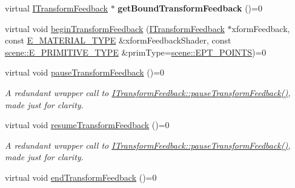 \begin{DoxyCompactItemize}
\item 
virtual \hyperlink{classirr_1_1video_1_1ITransformFeedback}{I\+Transform\+Feedback} $\ast$ {\bfseries get\+Bound\+Transform\+Feedback} ()=0\hypertarget{classirr_1_1video_1_1IVideoDriver_aaf763ec31cb9281ea403716a92c09410}{}\label{classirr_1_1video_1_1IVideoDriver_aaf763ec31cb9281ea403716a92c09410}

\item 
virtual void \hyperlink{classirr_1_1video_1_1IVideoDriver_a2f5b83de6b1fff8059d443760a1e266e}{begin\+Transform\+Feedback} (\hyperlink{classirr_1_1video_1_1ITransformFeedback}{I\+Transform\+Feedback} $\ast$xform\+Feedback, const \hyperlink{namespaceirr_1_1video_ac8e9b6c66f7cebabd1a6d30cbc5430f1}{E\+\_\+\+M\+A\+T\+E\+R\+I\+A\+L\+\_\+\+T\+Y\+PE} \&xform\+Feedback\+Shader, const \hyperlink{namespaceirr_1_1scene_a5d7de82f2169761194b2f44d95cdc1dc}{scene\+::\+E\+\_\+\+P\+R\+I\+M\+I\+T\+I\+V\+E\+\_\+\+T\+Y\+PE} \&prim\+Type=\hyperlink{namespaceirr_1_1scene_a5d7de82f2169761194b2f44d95cdc1dca180689eadf794441c2c2dcd87462e203}{scene\+::\+E\+P\+T\+\_\+\+P\+O\+I\+N\+TS})=0
\item 
virtual void \hyperlink{classirr_1_1video_1_1IVideoDriver_a48d9a5dddc334f33b7183d51e2632fdf}{pause\+Transform\+Feedback} ()=0\hypertarget{classirr_1_1video_1_1IVideoDriver_a48d9a5dddc334f33b7183d51e2632fdf}{}\label{classirr_1_1video_1_1IVideoDriver_a48d9a5dddc334f33b7183d51e2632fdf}

\begin{DoxyCompactList}\small\item\em A redundant wrapper call to \hyperlink{classirr_1_1video_1_1ITransformFeedback_ad6b5bfc841c37ea0c52eb40cf30b61c6}{I\+Transform\+Feedback\+::pause\+Transform\+Feedback()}, made just for clarity. \end{DoxyCompactList}\item 
virtual void \hyperlink{classirr_1_1video_1_1IVideoDriver_a0b4f5b82710a7a861f68898987f93ad1}{resume\+Transform\+Feedback} ()=0\hypertarget{classirr_1_1video_1_1IVideoDriver_a0b4f5b82710a7a861f68898987f93ad1}{}\label{classirr_1_1video_1_1IVideoDriver_a0b4f5b82710a7a861f68898987f93ad1}

\begin{DoxyCompactList}\small\item\em A redundant wrapper call to \hyperlink{classirr_1_1video_1_1ITransformFeedback_ad6b5bfc841c37ea0c52eb40cf30b61c6}{I\+Transform\+Feedback\+::pause\+Transform\+Feedback()}, made just for clarity. \end{DoxyCompactList}\item 
virtual void \hyperlink{classirr_1_1video_1_1IVideoDriver_a692be066885a3d0a5b777bfd16cac196}{end\+Transform\+Feedback} ()=0\hypertarget{classirr_1_1video_1_1IVideoDriver_a692be066885a3d0a5b777bfd16cac196}{}\label{classirr_1_1video_1_1IVideoDriver_a692be066885a3d0a5b777bfd16cac196}


\end{DoxyCompactItemize}
